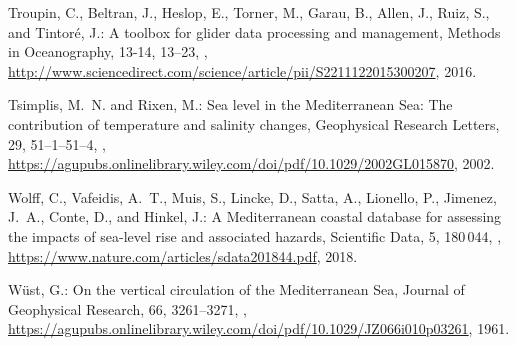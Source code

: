 \documentclass[essd]{copernicus}
\begin{document}
\begin{thebibliography}{46}
Troupin, C., Beltran, J., Heslop, E., Torner, M., Garau, B., Allen, J., Ruiz,
  S., and Tintor\'{e}, J.: {A toolbox for glider data processing and
  management}, Methods in Oceanography, {13-14}, 13--23,
  ,
  \urlprefix\url{http://www.sciencedirect.com/science/article/pii/S2211122015300207},
  2016.

Tsimplis, M.~N. and Rixen, M.: Sea level in the Mediterranean Sea: The
  contribution of temperature and salinity changes, Geophysical Research
  Letters, 29, 51–1–51–4, ,
  \urlprefix\url{https://agupubs.onlinelibrary.wiley.com/doi/pdf/10.1029/2002GL015870},
  2002.

Wolff, C., Vafeidis, A.~T., Muis, S., Lincke, D., Satta, A., Lionello, P.,
  Jimenez, J.~A., Conte, D., and Hinkel, J.: A Mediterranean coastal database
  for assessing the impacts of sea-level rise and associated hazards,
  Scientific Data, 5, 180\,044, ,
  \urlprefix\url{https://www.nature.com/articles/sdata201844.pdf}, 2018.

W\"{u}st, G.: On the vertical circulation of the Mediterranean Sea, Journal of
  Geophysical Research, 66, 3261–3271, ,
  \urlprefix\url{https://agupubs.onlinelibrary.wiley.com/doi/pdf/10.1029/JZ066i010p03261},
  1961.

\end{thebibliography}
\end{document}
